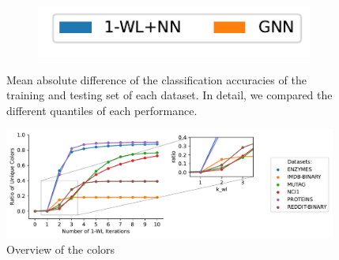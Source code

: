\begin{figure}[!htb]
	\centering
	\begin{subfigure}[b]{0.3\textwidth}
		\centering
		\includegraphics[width=\textwidth]{Figures/train_test_diff_legend.pdf}
		\vspace*{-4ex} 
	\end{subfigure}
	\caption{Mean absolute difference of the classification accuracies of the training and testing set of each dataset. In detail, we compared the different quantiles of each performance.}
\end{figure}

\begin{figure}[!htb]
	\centering
	\includegraphics[width=0.975\textwidth]{Figures/wl_unique_colors.pdf}
	\vspace*{-2ex} 
	\caption{Overview of the colors}
	\label{fig:wl_unique_colors}
\end{figure}

